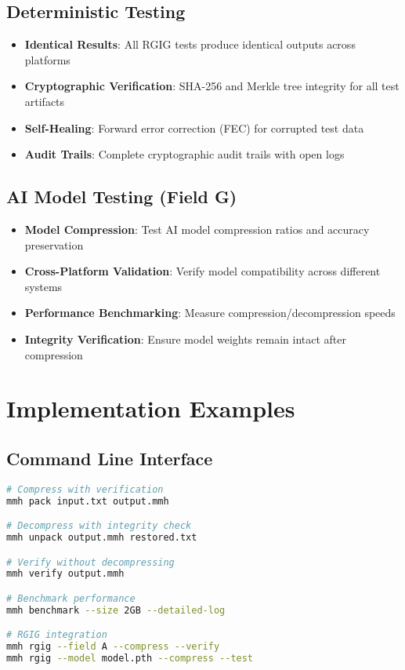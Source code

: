 \documentclass[12pt,a4paper]{article}
\begin{document}
\subsection{Deterministic Testing}
\begin{itemize}
    \item \textbf{Identical Results}: All RGIG tests produce identical outputs across platforms
    \item \textbf{Cryptographic Verification}: SHA-256 and Merkle tree integrity for all test artifacts
    \item \textbf{Self-Healing}: Forward error correction (FEC) for corrupted test data
    \item \textbf{Audit Trails}: Complete cryptographic audit trails with open logs
\end{itemize}

\subsection{AI Model Testing (Field G)}
\begin{itemize}
    \item \textbf{Model Compression}: Test AI model compression ratios and accuracy preservation
    \item \textbf{Cross-Platform Validation}: Verify model compatibility across different systems
    \item \textbf{Performance Benchmarking}: Measure compression/decompression speeds
    \item \textbf{Integrity Verification}: Ensure model weights remain intact after compression
\end{itemize}

\newpage

\section{Implementation Examples}

\subsection{Command Line Interface}
\begin{lstlisting}[language=bash, caption=Basic MMH-RS Usage]
# Compress with verification
mmh pack input.txt output.mmh

# Decompress with integrity check
mmh unpack output.mmh restored.txt

# Verify without decompressing
mmh verify output.mmh

# Benchmark performance
mmh benchmark --size 2GB --detailed-log

# RGIG integration
mmh rgig --field A --compress --verify
mmh rgig --model model.pth --compress --test
\end{lstlisting}
\end{document}
